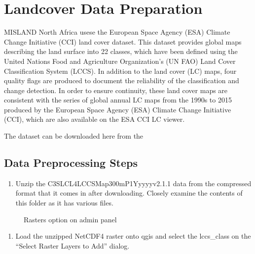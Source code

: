 \documentclass[letterpaper,10pt,english]{sphinxmanual}
\let\sphinxpxdimen\pdfpxdimen\else\newdimen\sphinxpxdimen
\begin{document}
\sphinxstepscope


\chapter{Landcover Data Preparation}
\label{\detokenize{Preprocessing/Landcover:landcover-data-preparation}}\label{\detokenize{Preprocessing/Landcover::doc}}
\sphinxAtStartPar
MISLAND North Africa usese the European Space Agency (ESA) Climate Change Initiative (CCI) land cover dataset. This dataset provides global maps describing the land surface into 22 classes, which have been defined using the United Nations Food and Agriculture Organization’s (UN FAO) Land Cover Classification System (LCCS). In addition to the land cover (LC) maps, four quality flags are produced to document the reliability of the classification and change detection.
In order to ensure continuity, these land cover maps are consistent with the series of global annual LC maps from the 1990s to 2015 produced by the European Space Agency (ESA) Climate Change Initiative (CCI), which are also available on the ESA CCI LC viewer.

\sphinxAtStartPar
The dataset can be downloaded here from the 


\section{Data Preprocessing Steps}
\label{\detokenize{Preprocessing/Landcover:data-preprocessing-steps}}\begin{enumerate}
%
\item {} 
\sphinxAtStartPar
Unzip the C3S\sphinxhyphen{}LC\sphinxhyphen{}L4\sphinxhyphen{}LCCS\sphinxhyphen{}Map\sphinxhyphen{}300m\sphinxhyphen{}P1Y\sphinxhyphen{}yyyy\sphinxhyphen{}v2.1.1 data from the compressed format that it comes in after downloading. Closely examine the contents of this folder as it has various files.

\end{enumerate}

\begin{figure}[H]
\centering
\capstart

\noindent\sphinxincludegraphics[width=800\sphinxpxdimen,height=400\sphinxpxdimen]{{LC1}.png}
\caption{Rasters option on admin panel}\label{\detokenize{Preprocessing/Landcover:id3}}\end{figure}
\begin{enumerate}
%
\setcounter{enumi}{1}
\item {} 
\sphinxAtStartPar
Load the unzipped NetCDF4 raster onto qgis and select the lccs\_class on the “Select Raster Layers to Add” dialog.

\end{enumerate}
\end{document}
